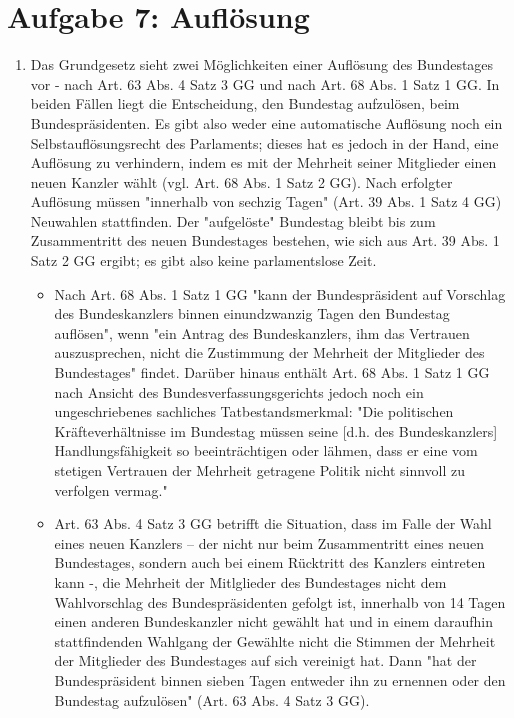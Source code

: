 \documentclass{article}
\begin{document}
	\section*{Aufgabe 7: Auflösung}
	\begin{enumerate}[label=(\alph*)]
		\item Das Grundgesetz sieht zwei Möglichkeiten einer Auflösung des Bundestages vor - nach Art. 63 Abs. 4 Satz 3 GG und nach Art. 68 Abs. 1 Satz 1 GG. In beiden Fällen liegt die Entscheidung, den Bundestag aufzulösen, beim Bundespräsidenten. Es gibt also weder eine automatische Auflösung noch ein Selbstauflösungsrecht des Parlaments; dieses hat es jedoch in der Hand, eine Auflösung zu verhindern, indem es mit der Mehrheit seiner Mitglieder einen neuen Kanzler wählt (vgl. Art. 68 Abs. 1 Satz 2 GG). Nach erfolgter Auflösung müssen "innerhalb von sechzig Tagen" (Art. 39 Abs. 1 Satz 4 GG) Neuwahlen stattfinden. Der "aufgelöste" Bundestag bleibt bis zum Zusammentritt des neuen Bundestages bestehen, wie sich aus Art. 39 Abs. 1 Satz 2 GG ergibt; es gibt also keine parlamentslose Zeit.
		\begin{itemize}
			\item Nach Art. 68 Abs. 1 Satz 1 GG "kann der Bundespräsident auf Vorschlag des Bundeskanzlers binnen einundzwanzig Tagen den Bundestag auflösen", wenn "ein Antrag des Bundeskanzlers, ihm das Vertrauen auszusprechen, nicht die Zustimmung der Mehrheit der Mitglieder des Bundestages" findet. Darüber hinaus enthält Art. 68 Abs. 1 Satz 1 GG nach Ansicht des Bundesverfassungsgerichts jedoch noch ein ungeschriebenes sachliches Tatbestandsmerkmal: "Die politischen Kräfteverhältnisse im Bundestag müssen seine [d.h. des Bundeskanzlers] Handlungsfähigkeit so beeinträchtigen oder lähmen, dass er eine vom stetigen Vertrauen der Mehrheit getragene Politik nicht sinnvoll zu verfolgen vermag."
			\item Art. 63 Abs. 4 Satz 3 GG betrifft die Situation, dass im Falle der Wahl eines neuen Kanzlers – der nicht nur beim Zusammentritt eines neuen Bundestages, sondern auch bei einem Rücktritt des Kanzlers eintreten kann -, die Mehrheit der Mitlglieder des Bundestages nicht dem Wahlvorschlag des Bundespräsidenten gefolgt ist, innerhalb von 14 Tagen einen anderen Bundeskanzler nicht gewählt hat und in einem daraufhin stattfindenden Wahlgang der Gewählte nicht die Stimmen der Mehrheit der Mitglieder des Bundestages auf sich vereinigt hat. Dann "hat der Bundespräsident binnen sieben Tagen entweder ihn zu ernennen oder den Bundestag aufzulösen" (Art. 63 Abs. 4 Satz 3 GG).

\end{itemize}
\end{enumerate}
\end{document}
